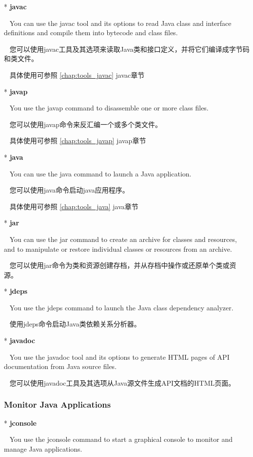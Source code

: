 * \textbf{javac}

~ You can use the javac tool and its options to read Java class and interface definitions and compile them into bytecode and class files.

~ 您可以使用javac工具及其选项来读取Java类和接口定义，并将它们编译成字节码和类文件。

\hypersetup{linkcolor=blue}

~ 具体使用可参照 \textcolor{blue}{\ref{chap:tools_javac}} javac章节

* \textbf{javap}

~ You use the javap command to disassemble one or more class files.

~ 您可以使用javap命令来反汇编一个或多个类文件。

\hypersetup{linkcolor=blue}

~ 具体使用可参照 \textcolor[rgb]{0,0,1}{\ref{chap:tools_javap}} javap章节

* \textbf{java} 

~ You can use the java command to launch a Java application.

~ 您可以使用java命令启动java应用程序。

~ 具体使用可参照 \textcolor[rgb]{0,0,1}{\ref{chap:tools_java}} java章节

* \textbf{jar}

~ You can use the jar command to create an archive for classes and resources, and to manipulate or restore individual classes or resources from an archive.

~ 您可以使用jar命令为类和资源创建存档，并从存档中操作或还原单个类或资源。

* \textbf{jdeps} 

~ You use the jdeps command to launch the Java class dependency analyzer.

~ 使用jdeps命令启动Java类依赖关系分析器。

* \textbf{javadoc}

~ You use the javadoc tool and its options to generate HTML pages of API documentation from Java source files.

~ 您可以使用javadoc工具及其选项从Java源文件生成API文档的HTML页面。

\subsubsection{Monitor Java Applications}

* \textbf{jconsole} 

~ You use the jconsole command to start a graphical console to monitor and manage Java applications.

